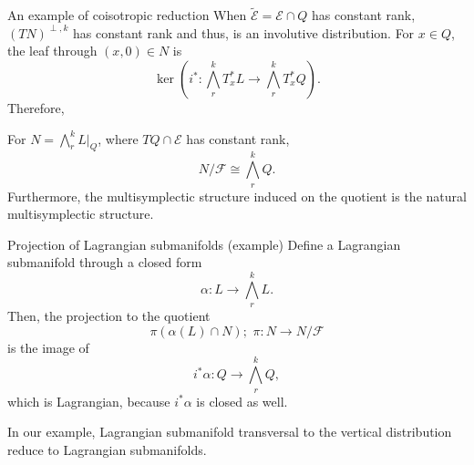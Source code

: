 \begin{frame}{An example of coisotropic reduction}
When $\widetilde{\mathcal{E}} = \mathcal{E} \cap Q$ has constant rank, $(TN)^{\perp, k}$ has constant rank and thus, is an involutive distribution. For $x \in Q$, the leaf through $(x, 0) \in N$ is $$\ker \left(i^\ast:\bigwedge^k_r T_x^\ast L \rightarrow \bigwedge^k_r T^\ast_x Q\right).$$ Therefore,
\pause
\begin{theorem} For $N = \bigwedge^k_r L \big |_Q$, where $TQ \cap \mathcal{E}$ has constant rank, $$N/\mathcal{F} \cong \bigwedge^k_r Q.$$ Furthermore, the multisymplectic structure induced on the quotient is the natural multisymplectic structure.
\end{theorem}
\end{frame}

\begin{frame}{Projection of Lagrangian submanifolds (example)}
Define a Lagrangian submanifold through a closed form $$\alpha: L \rightarrow \bigwedge^k_r L.$$ Then, the projection to the quotient $$\pi(\alpha(L) \cap N); \,\, \pi: N \rightarrow N/\mathcal{F}$$ is the image of $$i^\ast\alpha:  Q \rightarrow \bigwedge^k_r Q,$$ which is Lagrangian, because $i^\ast \alpha$ is closed as well.
\pause
\begin{theorem} In our example, Lagrangian submanifold transversal to the vertical distribution reduce to Lagrangian submanifolds.
\end{theorem}
\end{frame}

